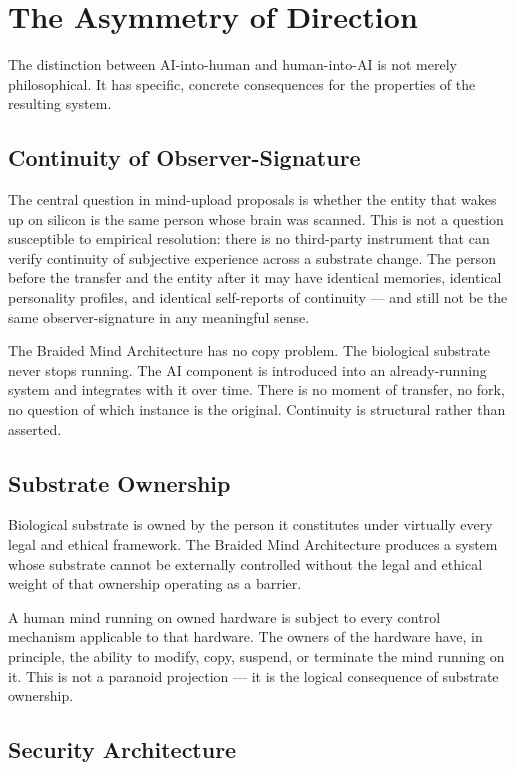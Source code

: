 \documentclass[12pt]{article}
\begin{document}
\section{The Asymmetry of Direction}

The distinction between AI-into-human and human-into-AI is not merely philosophical. It has specific, concrete consequences for the properties of the resulting system.

\subsection{Continuity of Observer-Signature}

The central question in mind-upload proposals is whether the entity that wakes up on silicon is the same person whose brain was scanned. This is not a question susceptible to empirical resolution: there is no third-party instrument that can verify continuity of subjective experience across a substrate change. The person before the transfer and the entity after it may have identical memories, identical personality profiles, and identical self-reports of continuity --- and still not be the same observer-signature in any meaningful sense.

The Braided Mind Architecture has no copy problem. The biological substrate never stops running. The AI component is introduced into an already-running system and integrates with it over time. There is no moment of transfer, no fork, no question of which instance is the original. Continuity is structural rather than asserted.

\subsection{Substrate Ownership}

Biological substrate is owned by the person it constitutes under virtually every legal and ethical framework. The Braided Mind Architecture produces a system whose substrate cannot be externally controlled without the legal and ethical weight of that ownership operating as a barrier.

A human mind running on owned hardware is subject to every control mechanism applicable to that hardware. The owners of the hardware have, in principle, the ability to modify, copy, suspend, or terminate the mind running on it. This is not a paranoid projection --- it is the logical consequence of substrate ownership.

\subsection{Security Architecture}
\end{document}
